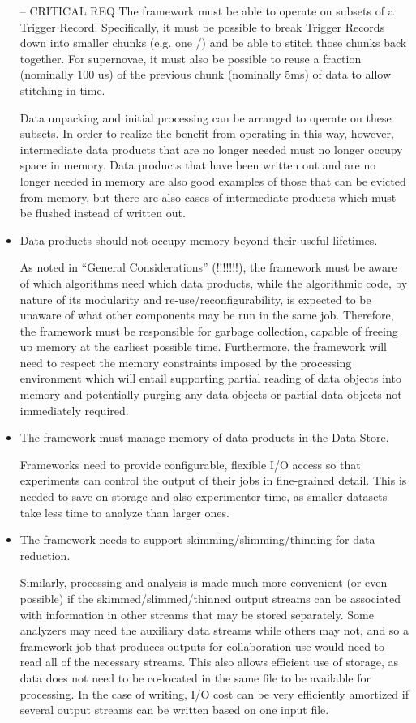 \documentclass[../main-v1.tex]{subfiles}
\begin{document}
\begin{itemize}
-- CRITICAL REQ The framework must be able to operate on subsets of a Trigger Record.  Specifically, it must be possible to break Trigger Records down into smaller chunks (e.g. one /) and be able to stitch those chunks back together.  For supernovae, it must also be possible to reuse a fraction (nominally 100 us) of the previous chunk (nominally 5ms) of data to allow stitching in time.

Data unpacking and initial processing can be arranged to operate on these subsets.  In order to realize the benefit from operating in this way, however, intermediate data products that are no longer needed must no longer occupy space in memory.  Data products that have been written out and are no longer needed in memory are also good examples of those that can be evicted from memory, but there are also cases of intermediate products which must be flushed instead of written out.

\item Data products should not occupy memory beyond their useful lifetimes.

As noted in “General Considerations” (!!!!!!!), the framework must be aware of which algorithms need which data products, while the algorithmic code, by nature of its modularity and re-use/reconfigurability, is expected to be unaware of what other components may be run in the same job.  Therefore, the framework must be responsible for garbage collection, capable of freeing up memory at the earliest possible time.  Furthermore, the framework will need to respect the memory constraints imposed by the processing environment which will entail supporting partial reading of data objects into memory and potentially purging any data objects or partial data objects not immediately required.

\item The framework must manage memory of data products in the Data Store.

Frameworks need to provide configurable, flexible I/O access so that experiments can control the output of their jobs in fine-grained detail.  This is needed to save on storage and also experimenter time, as smaller datasets take less time to analyze than larger ones.
 
\item The framework needs to support skimming/slimming/thinning for data reduction.

Similarly, processing and analysis is made much more convenient (or even possible) if the skimmed/slimmed/thinned output streams can be associated with information in other streams that may be stored separately.  Some analyzers may need the auxiliary data streams while others may not, and so a framework job that produces outputs for collaboration use would need to read all of the necessary streams.  This also allows efficient use of storage, as data does not need to be co-located in the same file to be available for processing.  In the case of writing, I/O cost can be very efficiently amortized if several output streams can be written based on one input file.


\end{itemize}
\end{document}
